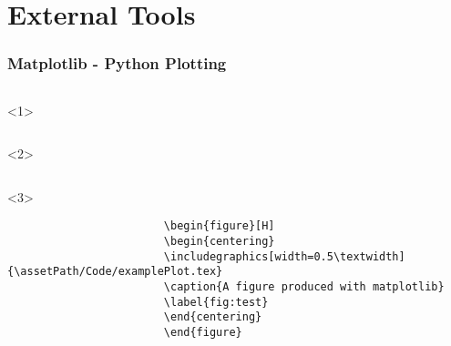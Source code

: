 \documentclass{beamer}
\begin{document}
    \section{External Tools}
        \begin{frame}[t,fragile]
            \frametitle{Matplotlib - Python Plotting}
            \begin{columns}[onlytextwidth]
                \begin{column}[T]{0.75\textwidth}
                    \begin{onlyenv}<1>
                        \inputminted{python}{\assetPath/Code/matplotlibexample.py}
                    \end{onlyenv}
                    \begin{onlyenv}<2>
                        \inputminted[firstline=29,lastline=45]{latex}{\assetPath/Code/examplePlot.tex}
                    \end{onlyenv}
                    \begin{onlyenv}<3>
                        \begin{verbatim}
                        \begin{figure}[H]
                        \begin{centering}
                        \includegraphics[width=0.5\textwidth] {\assetPath/Code/examplePlot.tex}
                        \caption{A figure produced with matplotlib}
                        \label{fig:test}
                        \end{centering}
                        \end{figure}
                        \end{verbatim}
                    \end{onlyenv}
                \end{column}\hfill
                \begin{column}[T]{0.2\textwidth}
                    
                \end{column}
            \end{columns}
        \end{frame}
\end{document}
